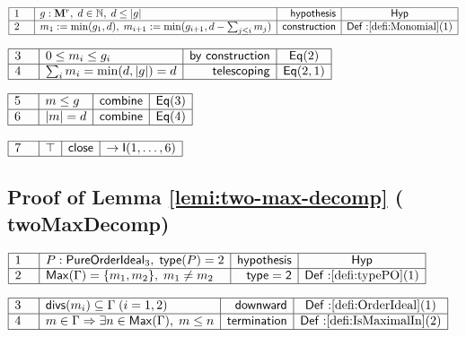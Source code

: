 \documentclass[11pt,reqno]{amsart}
\providecommand{\N}{\mathbb{N}}
\begin{document}
\noindent $%
\begin{array}{|m{0.5cm}|l|r|c|}
\hline
1 & g:\mathbf{M}^{r},\;d\in \N,\;d\leq |g| & \mathsf{hypothesis} & \mathsf{%
Hyp} \\ \hline
2 & m_{1}:=\min (g_{1},d),\;m_{i+1}:=\min (g_{i+1},d-\sum_{j\leq i}m_{j}) & 
\mathsf{construction} & \mathsf{Def:}\ref{defi:Monomial}(1) \\ \hline
\end{array}%
$

\nointerlineskip\noindent$%
\begin{array}{|m{0.5cm}|l|r|c|}
\hline
3 & 0\le m_{i}\le g_{i} & \mathsf{by\ construction} & \mathsf{Eq}(2) \\ 
\hline
4 & \sum_{i}m_{i}=\min(d,|g|)=d & \mathsf{telescoping} & \mathsf{Eq}(2,1) \\ 
\hline
\end{array}%
$

\nointerlineskip\noindent$%
\begin{array}{|m{0.5cm}|l|r|c|}
\hline
5 & m\le g & \mathsf{combine} & \mathsf{Eq}(3) \\ \hline
6 & |m|=d & \mathsf{combine} & \mathsf{Eq}(4) \\ \hline
\end{array}%
$

\nointerlineskip\noindent$%
\begin{array}{|m{0.5cm}|l|r|c|}
\hline
7 & \top & \mathsf{close} & \to\mathsf{I}(1,\dots,6) \\ \hline
\end{array}%
$

\medskip

\subsection*{Proof of Lemma \protect\ref{lemi:two-max-decomp} (\textsf{%
twoMaxDecomp})}

\noindent $%
\begin{array}{|m{0.5cm}|l|r|c|}
\hline
1 & P:\mathsf{PureOrderIdeal}_{3},\;\mathsf{type}(P)=2 & \mathsf{hypothesis}
& \mathsf{Hyp} \\ \hline
2 & \mathsf{Max}(\Gamma )=\{m_{1},m_{2}\},\;m_{1}\neq m_{2} & \mathsf{type=2}
& \mathsf{Def:}\ref{defi:typePO}(1) \\ \hline
\end{array}%
$

\nointerlineskip\noindent$%
\begin{array}{|m{0.5cm}|l|r|c|}
\hline
3 & \mathsf{divs}(m_{i})\subseteq\Gamma\;(i=1,2) & \mathsf{downward} & 
\mathsf{Def:}\ref{defi:OrderIdeal}(1) \\ \hline
4 & m\in\Gamma\Rightarrow\exists n\in\mathsf{Max}(\Gamma),\;m\le n & \mathsf{%
termination} & \mathsf{Def:}\ref{defi:IsMaximalIn}(2) \\ \hline
\end{array}%
$
\end{document}
